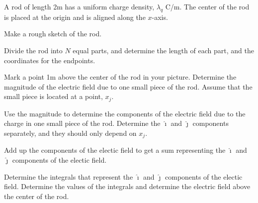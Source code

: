 \begin{problem}
  \item  A rod of length 2m has a uniform charge density, $\lambda_q$ C/m.
  The center of the rod is placed at the origin and is aligned along the
  $x$-axis.
  \begin{subproblem}
    \item Make a rough sketch of the rod.
         \vspace{7em}
   \item Divide the rod into $N$ equal parts, and determine the length of
         each part, and the coordinates for the endpoints.
         \vspace{7em}
     \item Mark a point 1m above the center of the rod in your picture.
      Determine the magnitude of the electric field due to one small piece of the rod.
      Assume that the small piece is located at a point, $x_j$.

      \vfill

      \clearpage

     \item Use the magnitude to determine the components of the electric field due to the charge in one small piece of the rod.
         Determine the $\hat{\imath}$ and $\hat{\jmath}$ components separately, and they should only depend on $x_j$.
       \vfill
     \item Add up the components of the electic field to get a sum representing the
      $\hat{\imath}$ and $\hat{\jmath}$ components of the electic field.
      \vfill
    \clearpage
    \item Determine the integrals that represent the $\hat{\imath}$ and $\hat{\jmath}$ components of the electic field.
      Determine the values of the integrals and determine the electric field above the center of the rod.
      \vfill
  \end{subproblem}

\end{problem}

\postClass

